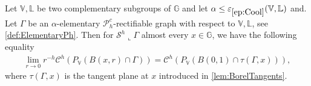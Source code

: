 \documentclass[10pt, a4paper,
oneside, headinclude,footinclude]{scrartcl}
\begin{document}
\begin{proposizione}\label{prop:CrucialLimit}
Let $\mathbb V,\mathbb L$ be two complementary subgroups of $\mathbb G$ and let $\alpha\leq\oldep{ep:Cool}(\mathbb V,\mathbb L)$ and. Let $\Gamma$ be an $\alpha$-elementary $\mathscr{P}_h^c$-rectifiable graph with respect to $\mathbb V,\mathbb L$, see \cref{def:ElementaryPh}. Then for $\mathcal{S}^h\llcorner\Gamma$ almost every $x\in \mathbb G$, we have the following equality 
\begin{equation}\label{eqn:LHS=RHSCENTR}
\begin{split}
    \lim_{r\to 0}r^{-h}\mathcal{C}^h(P_{\mathbb V}(B(x,r)\cap\Gamma)) = \mathcal{C}^h(P_{\mathbb V}(B(0,1)\cap\tau(\Gamma,x))),
    \end{split}
\end{equation}
where $\tau(\Gamma,x)$ is the tangent plane at $x$ introduced in \cref{lem:BorelTangents}.
\end{proposizione}
\end{document}
